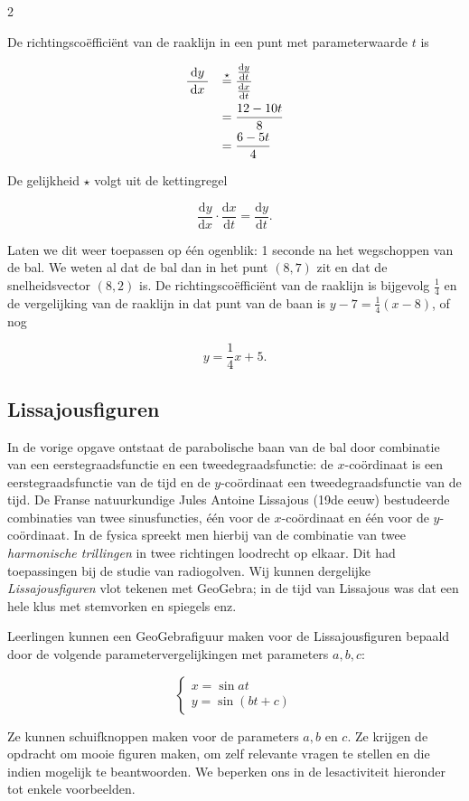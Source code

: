 \begin{multicols}{2}

De richtingscoëfficiënt van de raaklijn in een punt met parameterwaarde $t$ is 

$$
\begin{array}{rl}
     \dfrac{\;\mathrm{d}y\;}{\mathrm{d}x}& \stackrel{\star}{=}\dfrac{\frac{\mathrm{d}y}{\mathrm{d}t}}{\frac{\mathrm{d}x}{\mathrm{d}t}}
     \vspace{1.5mm}\\
     & =\dfrac{12-10t}{8}
     \vspace{1mm}\\
     & =\dfrac{6-5t}{4}
\end{array}
$$

De gelijkheid $\star$ volgt uit de kettingregel

$$\frac{\mathrm{d}y}{\mathrm{d}x}\cdot \frac{\mathrm{d}x}{\mathrm{d}t}= \frac{\mathrm{d}y}{\mathrm{d}t}.$$

Laten we dit weer toepassen op één ogenblik: 1 seconde na het wegschoppen van de bal. We weten al dat de bal dan in het punt $(8, 7)$ zit en dat de snelheidsvector $(8, 2)$ is. De richtingscoëfficiënt van de raaklijn is bijgevolg $\frac{1}{4}$ en de vergelijking van de raaklijn in dat punt van de baan is $y-7=\frac{1}{4}(x-8)$, of nog

$$y=\frac{1}{4}x+5.$$

\subsection{Lissajousfiguren}

In de vorige opgave ontstaat de parabolische baan van de bal door combinatie van een eerstegraadsfunctie en een tweedegraadsfunctie: de $x$-coördinaat is een eerstegraadsfunctie van de tijd en de $y$-coördinaat een tweedegraadsfunctie van de tijd. De Franse natuurkundige Jules Antoine Lissajous (19de eeuw) bestudeerde combinaties van twee sinusfuncties, één voor de $x$-coördinaat en één voor de $y$-coördinaat. In de fysica spreekt men hierbij van de combinatie van twee \emph{harmonische trillingen} in twee richtingen loodrecht op elkaar. Dit had toepassingen bij de studie van radiogolven. Wij kunnen dergelijke \emph{Lissajousfiguren} vlot tekenen met GeoGebra; in de tijd van Lissajous was dat een hele klus met stemvorken en spiegels enz.

Leerlingen kunnen een GeoGebrafiguur maken voor de Lissajousfiguren bepaald door de volgende parametervergelijkingen met parameters $a, b, c$:

$$\left\{ 
    \begin{array}{l}
         x = \sin{at}\\
         y = \sin{(bt+c)}
    \end{array}
    \right.$$

Ze kunnen schuifknoppen maken voor de parameters $a, b$ en $c$. Ze krijgen de opdracht om mooie figuren maken, om zelf relevante vragen te stellen en die indien mogelijk te beantwoorden. We beperken ons in de lesactiviteit hieronder tot enkele voorbeelden.

\end{multicols}

